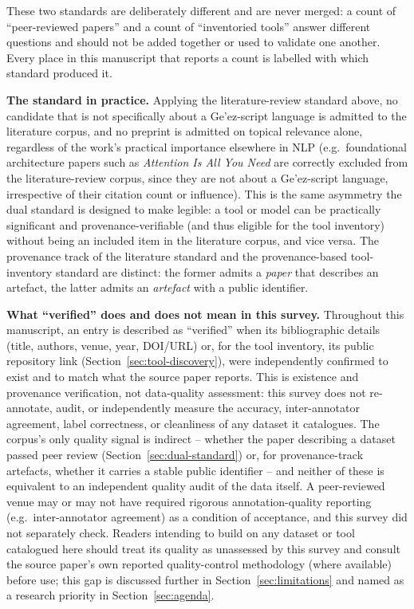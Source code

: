 \documentclass[sn-mathphys-num]{sn-jnl}
\theoremstyle{thmstyleone}
\theoremstyle{thmstyletwo}
\theoremstyle{thmstylethree}
\begin{document}
These two standards are deliberately different and are never merged: a count of ``peer-reviewed papers'' and a count of ``inventoried tools'' answer different questions and should not be added together or used to validate one another. Every place in this manuscript that reports a count is labelled with which standard produced it.

\textbf{The standard in practice.} Applying the literature-review standard above, no candidate that is not specifically about a Ge'ez-script language is admitted to the literature corpus, and no preprint is admitted on topical relevance alone, regardless of the work's practical importance elsewhere in NLP (e.g.\ foundational architecture papers such as \emph{Attention Is All You Need} are correctly excluded from the literature-review corpus, since they are not about a Ge'ez-script language, irrespective of their citation count or influence). This is the same asymmetry the dual standard is designed to make legible: a tool or model can be practically significant and provenance-verifiable (and thus eligible for the tool inventory) without being an included item in the literature corpus, and vice versa. The provenance track of the literature standard and the provenance-based tool-inventory standard are distinct: the former admits a \emph{paper} that describes an artefact, the latter admits an \emph{artefact} with a public identifier.

\textbf{What ``verified'' does and does not mean in this survey.} Throughout this manuscript, an entry is described as ``verified'' when its bibliographic details (title, authors, venue, year, DOI/URL) or, for the tool inventory, its public repository link (Section~\ref{sec:tool-discovery}), were independently confirmed to exist and to match what the source paper reports. This is existence and provenance verification, not data-quality assessment: this survey does not re-annotate, audit, or independently measure the accuracy, inter-annotator agreement, label correctness, or cleanliness of any dataset it catalogues. The corpus's only quality signal is indirect -- whether the paper describing a dataset passed peer review (Section~\ref{sec:dual-standard}) or, for provenance-track artefacts, whether it carries a stable public identifier -- and neither of these is equivalent to an independent quality audit of the data itself. A peer-reviewed venue may or may not have required rigorous annotation-quality reporting (e.g.\ inter-annotator agreement) as a condition of acceptance, and this survey did not separately check. Readers intending to build on any dataset or tool catalogued here should treat its quality as unassessed by this survey and consult the source paper's own reported quality-control methodology (where available) before use; this gap is discussed further in Section~\ref{sec:limitations} and named as a research priority in Section~\ref{sec:agenda}.
\end{document}
